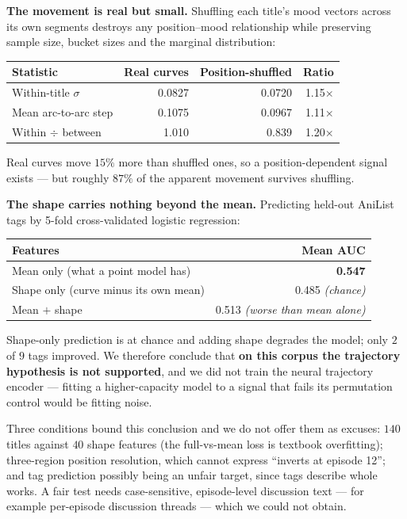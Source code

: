 \documentclass[11pt,a4paper]{article}
\begin{document}
\textbf{The movement is real but small.} Shuffling each title's mood vectors
across its own segments destroys any position--mood relationship while
preserving sample size, bucket sizes and the marginal distribution:

\begin{table}[h]
\centering
\begin{tabular}{lrrr}
\toprule
Statistic & Real curves & Position-shuffled & Ratio \\
\midrule
Within-title $\sigma$      & 0.0827 & 0.0720 & 1.15$\times$ \\
Mean arc-to-arc step       & 0.1075 & 0.0967 & 1.11$\times$ \\
Within $\div$ between      & 1.010  & 0.839  & 1.20$\times$ \\
\bottomrule
\end{tabular}
\end{table}

Real curves move $15\%$ more than shuffled ones, so a position-dependent signal
exists --- but roughly $87\%$ of the apparent movement survives shuffling.

\textbf{The shape carries nothing beyond the mean.} Predicting held-out AniList
tags by 5-fold cross-validated logistic regression:

\begin{table}[h]
\centering
\begin{tabular}{lr}
\toprule
Features & Mean AUC \\
\midrule
Mean only (what a point model has)        & \textbf{0.547} \\
Shape only (curve minus its own mean)     & 0.485 \emph{(chance)} \\
Mean $+$ shape                            & 0.513 \emph{(worse than mean alone)} \\
\bottomrule
\end{tabular}
\end{table}

Shape-only prediction is at chance and adding shape degrades the model; only
$2$ of $9$ tags improved. We therefore conclude that \textbf{on this corpus the
trajectory hypothesis is not supported}, and we did not train the neural
trajectory encoder --- fitting a higher-capacity model to a signal that fails
its permutation control would be fitting noise.

Three conditions bound this conclusion and we do not offer them as excuses:
$140$ titles against $40$ shape features (the full-vs-mean loss is textbook
overfitting); three-region position resolution, which cannot express ``inverts
at episode 12''; and tag prediction possibly being an unfair target, since tags
describe whole works. A fair test needs case-sensitive, episode-level discussion
text --- for example per-episode discussion threads --- which we could not
obtain.
\end{document}
